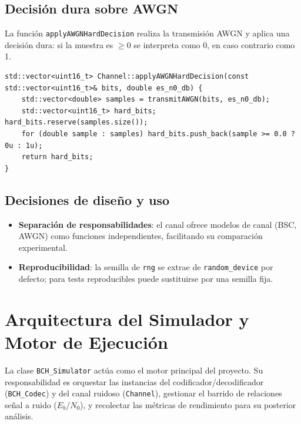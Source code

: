 \subsection{Decisión dura sobre AWGN}

La función \texttt{applyAWGNHardDecision} realiza la transmisión AWGN y aplica una decisión dura: si la muestra es $\ge 0$ se interpreta como 0, en caso contrario como 1.

\begin{lstlisting}[style=CodigoCPP, caption={Conversión de las muestras continuas recibidas del canal AWGN a valores binarios discretos mediante un proceso de decisión dura.}, label={lst:channel_awgn_hard}]
std::vector<uint16_t> Channel::applyAWGNHardDecision(const std::vector<uint16_t>& bits, double es_n0_db) {
    std::vector<double> samples = transmitAWGN(bits, es_n0_db);
    std::vector<uint16_t> hard_bits; hard_bits.reserve(samples.size());
    for (double sample : samples) hard_bits.push_back(sample >= 0.0 ? 0u : 1u);
    return hard_bits;
}
\end{lstlisting}

\subsection{Decisiones de diseño y uso}

\begin{itemize}
    \item \textbf{Separación de responsabilidades}: el canal ofrece modelos de canal (BSC, AWGN) como funciones independientes, facilitando su comparación experimental.
    \item \textbf{Reproducibilidad}: la semilla de \texttt{rng} se extrae de \texttt{random\_device} por defecto; para tests reproducibles puede sustituirse por una semilla fija.
\end{itemize}

\section{Arquitectura del Simulador y Motor de Ejecución}
\label{sec:bch_simulator}

La clase \texttt{BCH\_Simulator} actúa como el motor principal del proyecto. Su responsabilidad es orquestar las instancias del codificador/decodificador (\texttt{BCH\_Codec}) y del canal ruidoso (\texttt{Channel}), gestionar el barrido de relaciones señal a ruido ($E_b/N_0$), y recolectar las métricas de rendimiento para su posterior análisis.

